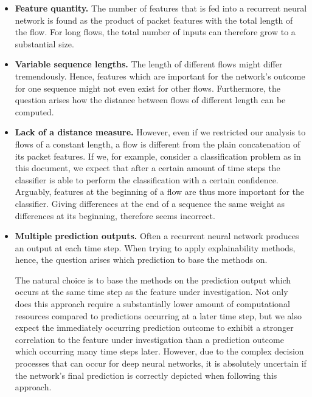 \documentclass[sigconf,nonacm]{acmart}
\begin{document}
\begin{itemize}
\item
\textbf{Feature quantity.}
The number of features that is fed into a recurrent neural network is found as the product of packet features with the total length of the flow. For long flows, the total number of inputs can therefore grow to a substantial size.

\item
\textbf{Variable sequence lengths.}
The length of different flows might differ tremendously. Hence, features which are important for the network's outcome for one sequence might not even exist for other flows. Furthermore, the question arises how the distance between flows of different length can be computed.

\item
\textbf{Lack of a distance measure.}
However, even if we restricted our analysis to flows of a constant length, a flow is different from the plain concatenation of its packet features.
If we, for example, consider a classification problem as in this document, we expect that after a certain amount of time steps the classifier is able to perform the classification with a certain confidence. Arguably, features at the beginning of a flow are thus more important for the classifier. Giving differences at the end of a sequence the same weight as differences at its beginning, therefore seems incorrect.

\item
\textbf{Multiple prediction outputs.}
Often a recurrent neural network produces an output at each time step. When trying to apply explainability methods, hence, the question arises which prediction to base the methods on.

The natural choice is to base the methods on the prediction output which occurs at the same time step as the feature under investigation. Not only does this approach require a substantially lower amount of computational resources compared to predictions occurring at a later time step, but we also expect the immediately occurring prediction outcome to exhibit a stronger correlation to the feature under investigation than a prediction outcome which occurring many time steps later. However, due to the complex decision processes that can occur for deep neural networks, it is absolutely  uncertain if the network's final prediction is correctly depicted when following this approach.
\end{itemize}
\end{document}
